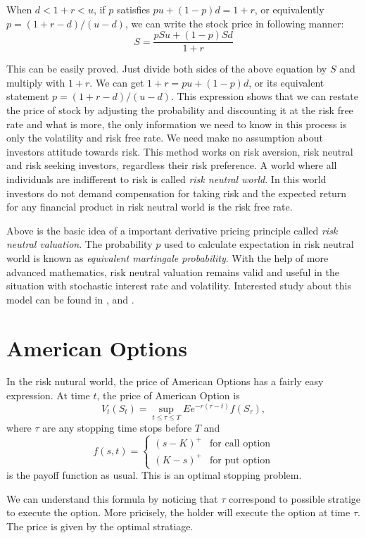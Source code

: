 \documentclass[11pt]{book}
\begin{document}
When $d < 1+r <u$, if $p$ satisfies $pu+(1-p)d= 1+r$, or equivalently $p=(1+r-d)/(u-d)$, we can write the stock price in following manner: 
\begin{equation}
S=\frac{pSu+(1-p)Sd}{1+r}
\end{equation}

This can be easily proved. Just divide both sides of the above equation by $S$ and multiply with $1+r$. We can get $1+r = pu +(1-p)d$, or its equivalent statement $p=(1+r-d)/(u-d)$. This expression shows that we can 
restate the price of stock by adjusting the probability and discounting it at the risk free rate and what is more,     the only information we need to know in this process is only the volatility and risk free rate. We need make no assumption about investors attitude towards risk. This method works on risk aversion, risk neutral and risk seeking investors, regardless their risk preference. A world where all individuals are indifferent to risk is called {\it risk neutral world}. In this world investors do not demand compensation for taking risk and the expected return for any financial product in risk neutral world is the risk free rate.

Above is the basic idea of a important derivative pricing principle called {\it risk neutral valuation}. The probability $p$ used to calculate expectation in risk neutral world is known as {\it equivalent martingale probability}. With the help of more advanced mathematics, risk neutral valuation remains valid and useful in the situation with stochastic interest rate and volatility. Interested study about this model can be found in \cite{HarrisonKreps1979}, \cite{Harrison1981} and \cite{Kreps1981}.



\section{American Options}
In the risk nutural world, the price of American Options has a fairly easy 
expression. At time $t$, the price of American Option is
\[
V_t(S_t) =\sup_{t\leq \tau\leq  T}Ee^{-r(\tau-t)}f(S_\tau),
\]
where $\tau$ are any stopping time stops before $T$ and
\[
f(s,t) = 
\begin{cases}
(s-K)^+ & \text{for call option}\\
(K-s)^+ & \text{for put option}
\end{cases}
\]
is the payoff function as usual.
This is an optimal stopping problem. 

We can understand this formula by noticing that $\tau$ correspond to possible 
stratige to execute the option. 
More pricisely, the holder will execute the option at time $\tau$.
The price is given by the optimal stratiage. 
\end{document}
